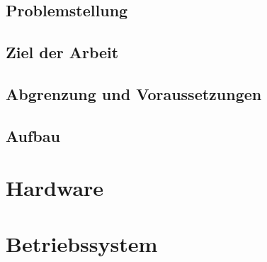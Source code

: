 \documentclass[
    headings=optiontotocandhead,%
    twoside,
    numbers=noenddot,%
    toc=flat, %
    12pt, %
    titlepage, %
    parskip=full, %
    listof=totoc, %
    listof=flat, %
    numbers=noenddot, %
    bibliography=totoc, %
    a4paper,DIV=14,
    BCOR=15mm,
]{scrbook}
\begin{document}
\section{Problemstellung}\label{Problemstellung}

\renewcommand{\kapitelautor}{Autor: Clemens Scharwitzl}



\section{Ziel der Arbeit}\label{Ziel-der-Arbeit}

\renewcommand{\kapitelautor}{Autor: Florian Steiner, Clemens Scharwitzl, Dominik Nußbaumer}



\section{Abgrenzung und Voraussetzungen}\label{Abgrenzung-und-Voraussetzungen}

\renewcommand{\kapitelautor}{Autor: Florian Steiner}



\section{Aufbau}\label{Aufbau}

\renewcommand{\kapitelautor}{Autor: Florian Steiner, Dominik Nußbaumer}



\chapter{Hardware}\label{Hardware}

\renewcommand{\kapitelautor}{Autor: Florian Steiner}




\chapter{Betriebssystem}\label{Betriebssystem}


\end{document}
